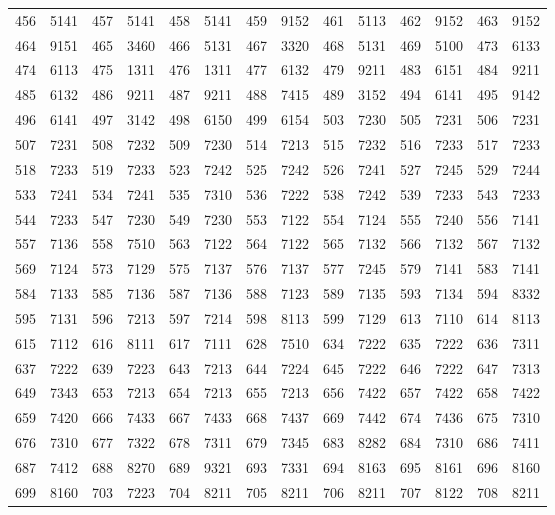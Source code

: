 \begin{threeparttable}
{\begin{tabular}{|cc|cc|cc|cc|cc|cc|cc|}
456 & 5141 & 457 & 5141 & 458 & 5141 & 459 & 9152 & 461 & 5113 & 462 & 9152 & 463 & 9152\\
464 & 9151 & 465 & 3460 & 466 & 5131 & 467 & 3320 & 468 & 5131 & 469 & 5100 & 473 & 6133\\
474 & 6113 & 475 & 1311 & 476 & 1311 & 477 & 6132 & 479 & 9211 & 483 & 6151 & 484 & 9211\\
485 & 6132 & 486 & 9211 & 487 & 9211 & 488 & 7415 & 489 & 3152 & 494 & 6141 & 495 & 9142\\
496 & 6141 & 497 & 3142 & 498 & 6150 & 499 & 6154 & 503 & 7230 & 505 & 7231 & 506 & 7231\\
507 & 7231 & 508 & 7232 & 509 & 7230 & 514 & 7213 & 515 & 7232 & 516 & 7233 & 517 & 7233\\
518 & 7233 & 519 & 7233 & 523 & 7242 & 525 & 7242 & 526 & 7241 & 527 & 7245 & 529 & 7244\\
533 & 7241 & 534 & 7241 & 535 & 7310 & 536 & 7222 & 538 & 7242 & 539 & 7233 & 543 & 7233\\
544 & 7233 & 547 & 7230 & 549 & 7230 & 553 & 7122 & 554 & 7124 & 555 & 7240 & 556 & 7141\\
557 & 7136 & 558 & 7510 & 563 & 7122 & 564 & 7122 & 565 & 7132 & 566 & 7132 & 567 & 7132\\
569 & 7124 & 573 & 7129 & 575 & 7137 & 576 & 7137 & 577 & 7245 & 579 & 7141 & 583 & 7141\\
584 & 7133 & 585 & 7136 & 587 & 7136 & 588 & 7123 & 589 & 7135 & 593 & 7134 & 594 & 8332\\
595 & 7131 & 596 & 7213 & 597 & 7214 & 598 & 8113 & 599 & 7129 & 613 & 7110 & 614 & 8113\\
615 & 7112 & 616 & 8111 & 617 & 7111 & 628 & 7510 & 634 & 7222 & 635 & 7222 & 636 & 7311\\
637 & 7222 & 639 & 7223 & 643 & 7213 & 644 & 7224 & 645 & 7222 & 646 & 7222 & 647 & 7313\\
649 & 7343 & 653 & 7213 & 654 & 7213 & 655 & 7213 & 656 & 7422 & 657 & 7422 & 658 & 7422\\
659 & 7420 & 666 & 7433 & 667 & 7433 & 668 & 7437 & 669 & 7442 & 674 & 7436 & 675 & 7310\\
676 & 7310 & 677 & 7322 & 678 & 7311 & 679 & 7345 & 683 & 8282 & 684 & 7310 & 686 & 7411\\
687 & 7412 & 688 & 8270 & 689 & 9321 & 693 & 7331 & 694 & 8163 & 695 & 8161 & 696 & 8160\\
699 & 8160 & 703 & 7223 & 704 & 8211 & 705 & 8211 & 706 & 8211 & 707 & 8122 & 708 & 8211\\

\end{tabular}}
\end{threeparttable}
